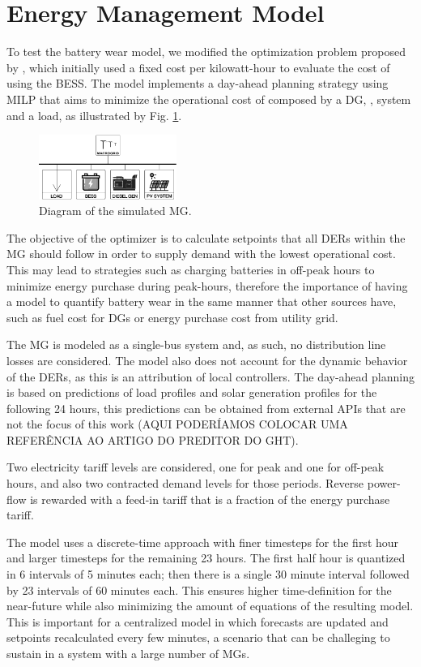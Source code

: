\documentclass{ieeeaccess}
\begin{document}
    \section{Energy Management Model}
    To test the battery wear model, we modified the optimization problem proposed by \cite{SANTOS2018}, which initially used a fixed cost per kilowatt-hour to evaluate the cost of using the \ac{BESS}. The model implements a day-ahead planning strategy using \ac{MILP} that aims to minimize the operational cost of  composed by a \ac{DG}, ,  system and a load, as illustrated by Fig. \ref{fig:mg1}.
    \begin{figure}[htbp]
        \centering
        \includegraphics[width=0.4\textwidth]{figures/mg2.png}
        \caption{Diagram of the simulated \ac{MG}.}
        \label{fig:mg1}
    \end{figure}
    
    The objective of the optimizer is to calculate setpoints that all DERs within the \ac{MG} should follow in order to supply demand with the lowest operational cost. This may lead to strategies such as charging batteries in off-peak hours to minimize energy purchase during peak-hours, therefore the importance of having a model to quantify battery wear in the same manner that other sources have, such as fuel cost for \acp{DG} or energy purchase cost from utility grid.

    The \ac{MG} is modeled as a single-bus system and, as such, no distribution line losses are considered. The model also does not account for the dynamic behavior of the DERs, as this is an attribution of local controllers. The day-ahead planning is based on predictions of load profiles and solar generation profiles for the following 24 hours, this predictions can be obtained from external APIs that are not the focus of this work (AQUI PODERÍAMOS COLOCAR UMA REFERÊNCIA AO ARTIGO DO PREDITOR DO GHT).
    
    Two electricity tariff levels are considered, one for peak and one for off-peak hours, and also two contracted demand levels for those periods. Reverse power-flow is rewarded with a feed-in tariff that is a fraction of the energy purchase tariff.

    The model uses a discrete-time approach with finer timesteps for the first hour and larger timesteps for the remaining 23 hours. The first half hour is quantized in 6 intervals of 5 minutes each; then there is a single 30 minute interval followed by 23 intervals of 60 minutes each. This ensures higher time-definition for the near-future while also minimizing the amount of equations of the resulting model. This is important for a centralized model in which forecasts are updated and setpoints recalculated every few minutes, a scenario that can be challeging to sustain in a system with a large number of \acp{MG}.
\end{document}
